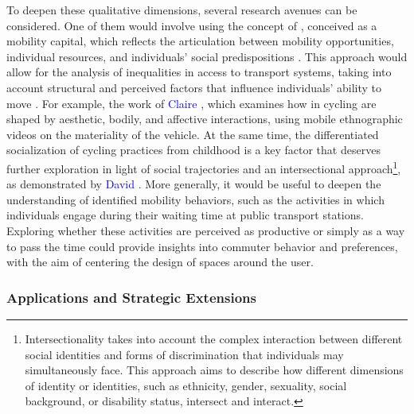 \begin{refsegment}
To deepen these qualitative dimensions, several research avenues can be considered. One of them would involve using the concept of , conceived as a mobility capital, which reflects the articulation between mobility opportunities, individual resources, and individuals' social predispositions \textcolor{blue}{\autocite[750]{kaufmann_motility_2004}}. This approach would allow for the analysis of inequalities in access to transport systems, taking into account structural and perceived factors that influence individuals' ability to move \textcolor{blue}{\autocite[45]{abord_dechatillon_velo_2021}}. For example, the work of \textcolor{blue}{Claire} \textcolor{blue}{\textcite{pelgrims_gendered_2023}}, which examines how  in cycling are shaped by aesthetic, bodily, and affective interactions, using mobile ethnographic videos on the materiality of the vehicle. At the same time, the differentiated socialization of cycling practices from childhood is a key factor that deserves further exploration in light of social trajectories and an intersectional approach\footnote{
    Intersectionality takes into account the complex interaction between different social identities and forms of discrimination that individuals may simultaneously face. This approach aims to describe how different dimensions of identity or identities, such as ethnicity, gender, sexuality, social background, or disability status, intersect and interact.
}, as demonstrated by \textcolor{blue}{David} \textcolor{blue}{\textcite[12-16]{sayagh_adolescentes_2018}}. More generally, it would be useful to deepen the understanding of identified mobility behaviors, such as the activities in which individuals engage during their waiting time at public transport stations. Exploring whether these activities are perceived as productive or simply as a way to pass the time could provide insights into commuter behavior and preferences, with the aim of centering the design of spaces around the user.%

\subsubsection*{Applications and Strategic Extensions
    \label{conclusion-generale:perspectives-prolongements}
    }


\end{refsegment}
